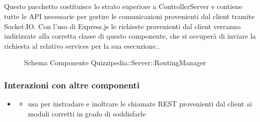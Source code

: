 \subsection{}
Questo pacchetto costituisce lo strato superiore a ControllerServer e contiene tutte le API necessarie per gestire le comunicazioni provenienti dal client tramite Socket.IO. 
Con l'uso di Express.js le richieste provenienti dal client verranno indirizzate alla corretta classe di questo componente, che si occuperà di inviare la richiesta al relativo services per la sua esecuzione..
\begin{figure}[H]
\centering
\noindent{}
\caption[Schema Componente Quizzipedia::Server::RoutingManager]{Schema Componente Quizzipedia::Server::RoutingManager}
\end{figure}
\subsubsection{Interazioni con altre componenti}
\begin{itemize}
\item {}
\begin{itemize}
\item usa  per instradare e inoltrare le chiamate REST provenienti dal client ai moduli corretti in grado di soddisfarle
\end{itemize}
\end{itemize}
